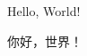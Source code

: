 \documentclass[11pt]{article}  %
\begin{document}
               
\begin{CJK}{UTF8}{song}        
  Hello, World!

  你好，世界！
\end{CJK}
\end{document}

